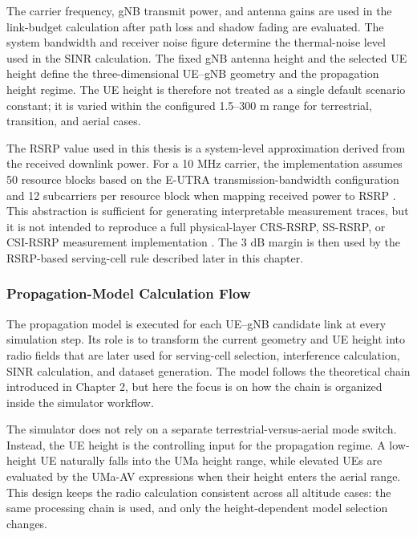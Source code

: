 The carrier frequency, gNB transmit power, and antenna gains are used in the
link-budget calculation after path loss and shadow fading are evaluated. The
system bandwidth and receiver noise figure determine the thermal-noise level
used in the SINR calculation. The fixed gNB antenna height and the selected UE
height define the three-dimensional UE--gNB geometry and the propagation height
regime. The UE height is therefore not treated as a single default scenario
constant; it is varied within the configured 1.5--300 m range for terrestrial,
transition, and aerial cases.

The RSRP value used in this thesis is a system-level approximation derived from
the received downlink power. For a 10 MHz carrier, the implementation assumes
50 resource blocks based on the E-UTRA transmission-bandwidth configuration
and 12 subcarriers per resource block when mapping received power to RSRP
\cite{3gpp_36104,3gpp_36211}. This abstraction is sufficient for generating
interpretable measurement traces, but it is not intended to reproduce a full
physical-layer CRS-RSRP, SS-RSRP, or CSI-RSRP measurement implementation
\cite{3gpp_36214,3gpp_38215}. The 3 dB margin is then
used by the RSRP-based serving-cell rule described later in this chapter.

\subsubsection{Propagation-Model Calculation Flow}

The propagation model is executed for each UE--gNB candidate link at every simulation step. Its role is to transform the current geometry and UE height into radio fields that are later used for serving-cell selection, interference calculation, SINR calculation, and dataset generation. The model follows the theoretical chain introduced in Chapter 2, but here the focus is on how the chain is organized inside the simulator workflow.

The simulator does not rely on a separate terrestrial-versus-aerial mode switch. Instead, the UE height is the controlling input for the propagation regime. A low-height UE naturally falls into the UMa height range, while elevated UEs are evaluated by the UMa-AV expressions when their height enters the aerial range. This design keeps the radio calculation consistent across all altitude cases: the same processing chain is used, and only the height-dependent model selection changes.


